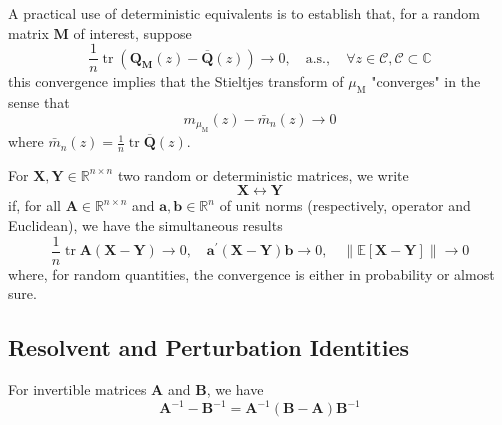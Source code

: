 \begin{remark}
    A practical use of deterministic equivalents is to establish that, for a random matrix $\mathbf{M}$ of interest, suppose
    \begin{equation*}
        \frac{1}{n}\operatorname{tr}\left(\mathbf{Q}_{\mathbf{M}}(z)-\overline{\mathbf{Q}}(z)\right)\rightarrow 0,\quad\text{a.s.},\quad\forall z\in\mathcal{C} ,\mathcal{C}\subset\mathbb{C}
    \end{equation*}
    this convergence implies that the Stieltjes transform of $\mu_{\mathrm{M}}$ "converges" in the sense that
    \begin{equation*}
        m_{\mu_{\mathrm{M}}}(z)-\bar{m}_{n}(z)\rightarrow 0
    \end{equation*}
    where $\bar{m}_{n}(z)=\frac{1}{n}\operatorname{tr}\overline{\mathbf{Q}}(z)$.
\end{remark}

\begin{definition}
    For $\mathbf{X},\mathbf{Y}\in\mathbb{R}^{n \times n}$ two random or deterministic matrices, we write
    \begin{equation}
        \mathbf{X}\leftrightarrow\mathbf{Y}
    \end{equation}
    if, for all $\mathbf{A}\in\mathbb{R}^{n\times n}$ and $\mathbf{a},\mathbf{b}\in\mathbb{R}^{n}$ of unit norms (respectively, operator and Euclidean), we have the simultaneous results
    \begin{equation*}
        \frac{1}{n}\operatorname{tr}\mathbf{A}(\mathbf{X}-\mathbf{Y})\rightarrow 0,\quad \mathbf{a}^{\prime}(\mathbf{X}-\mathbf{Y})\mathbf{b}\rightarrow 0,\quad\|\mathbb{E}[\mathbf{X}-\mathbf{Y}]\|\rightarrow 0
    \end{equation*}
    where, for random quantities, the convergence is either in probability or almost sure.
\end{definition}

\subsection*{Resolvent and Perturbation Identities}

\begin{lemma} \label{lem:resolvent-identity}
    For invertible matrices $\mathbf{A}$ and $\mathbf{B}$, we have
    \begin{equation}
        \mathbf{A}^{-1}-\mathbf{B}^{-1}=\mathbf{A}^{-1}\left(\mathbf{B}-\mathbf{A}\right)\mathbf{B}^{-1}
    \end{equation}
\end{lemma}

